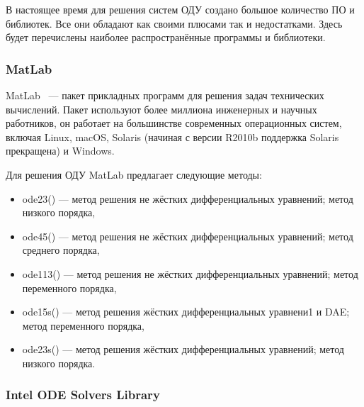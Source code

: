 В настоящее время для решения систем ОДУ создано большое количество ПО и библиотек. Все они обладают как своими плюсами так и недостатками. Здесь будет перечислены наиболее распространённые программы и библиотеки. 


\subsubsection{MatLab}

MatLab ~--- пакет прикладных программ для решения задач технических вычислений. Пакет используют более миллиона инженерных и научных работников, он работает на большинстве современных операционных систем, включая Linux, macOS, Solaris (начиная с версии R2010b поддержка Solaris прекращена) и Windows.

Для решения ОДУ MatLab предлагает следующие методы:
\begin{itemize}
    \item ode23() — метод решения не жёстких дифференциальных уравнений; метод низкого порядка,
    \item ode45() — метод решения не жёстких дифференциальных уравнений; метод среднего порядка,
    \item ode113() — метод решения не жёстких дифференциальных уравнений; метод переменного порядка,
    \item ode15s() — метод решения жёстких дифференциальных уравнени1 и DAE; метод переменного порядка,
    \item ode23s() — метод решения жёстких дифференциальных уравнений; метод низкого порядка.
\end{itemize}

\subsubsection{Intel ODE Solvers Library}

